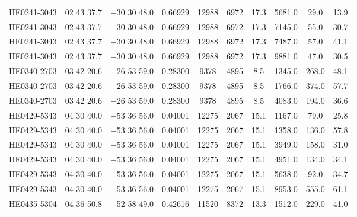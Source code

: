 \begin{landscape}
\begin{center}
\begin{longtable}{l c c c c c c c c c}
HE0241-3043  &             02 43 37.7  &         $-$30 30 48.0  &       0.66929  & 12988  &   6972  &       17.3  &      5681.0  &  29.0  &   13.9  \\
HE0241-3043  &             02 43 37.7  &         $-$30 30 48.0  &       0.66929  & 12988  &   6972  &       17.3  &      7145.0  &  55.0  &   30.7  \\
HE0241-3043  &             02 43 37.7  &         $-$30 30 48.0  &       0.66929  & 12988  &   6972  &       17.3  &      7487.0  &  57.0  &   41.1  \\
HE0241-3043  &             02 43 37.7  &         $-$30 30 48.0  &       0.66929  & 12988  &   6972  &       17.3  &      9881.0  &  47.0  &   30.5  \\
HE0340-2703  &             03 42 20.6  &         $-$26 53 59.0  &       0.28300  & 9378  &    4895  &       8.5  &       1345.0  &  268.0  &  48.1  \\
HE0340-2703  &             03 42 20.6  &         $-$26 53 59.0  &       0.28300  & 9378  &    4895  &       8.5  &       1766.0  &  374.0  &  57.7  \\
HE0340-2703  &             03 42 20.6  &         $-$26 53 59.0  &       0.28300  & 9378  &    4895  &       8.5  &       4083.0  &  194.0  &  36.6  \\
HE0429-5343  &             04 30 40.0  &         $-$53 36 56.0  &       0.04001  & 12275  &   2067  &       15.1  &      1167.0  &  79.0  &   25.8  \\
HE0429-5343  &             04 30 40.0  &         $-$53 36 56.0  &       0.04001  & 12275  &   2067  &       15.1  &      1358.0  &  136.0  &  57.8  \\
HE0429-5343  &             04 30 40.0  &         $-$53 36 56.0  &       0.04001  & 12275  &   2067  &       15.1  &      3949.0  &  158.0  &  31.0  \\
HE0429-5343  &             04 30 40.0  &         $-$53 36 56.0  &       0.04001  & 12275  &   2067  &       15.1  &      4951.0  &  134.0  &  34.1  \\
HE0429-5343  &             04 30 40.0  &         $-$53 36 56.0  &       0.04001  & 12275  &   2067  &       15.1  &      5638.0  &  92.0  &   34.7  \\
HE0429-5343  &             04 30 40.0  &         $-$53 36 56.0  &       0.04001  & 12275  &   2067  &       15.1  &      8953.0  &  555.0  &  61.1  \\
HE0435-5304  &             04 36 50.8  &         $-$52 58 49.0  &       0.42616  & 11520  &   8372  &       13.3  &      1512.0  &  229.0  &  41.0  \\

\end{longtable}
\end{center}
\end{landscape}
